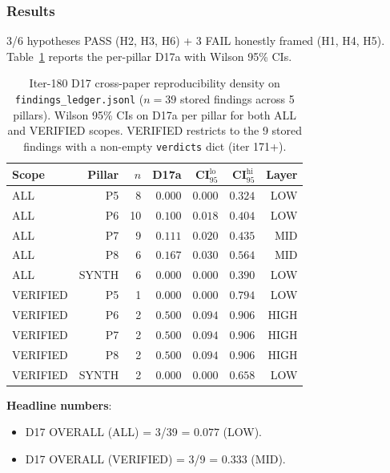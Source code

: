 \documentclass{article}
\begin{document}
\subsubsection{Results}\label{sec:synth-iter180-results}

3/6 hypotheses PASS (H2, H3, H6) + 3 FAIL honestly framed
(H1, H4, H5). Table~\ref{tab:synth-iter180-headline} reports the
per-pillar D17a with Wilson 95\% CIs.

\begin{table}[h]
\centering\small
\caption{Iter-180 D17 cross-paper reproducibility density on
\texttt{findings\_ledger.jsonl} ($n{=}39$ stored findings
across 5 pillars). Wilson 95\% CIs on D17a per pillar for both
ALL and VERIFIED scopes. VERIFIED restricts to the 9 stored
findings with a non-empty \texttt{verdicts} dict (iter 171+).}
\label{tab:synth-iter180-headline}
\begin{tabular}{lrrrrrr}
\hline
Scope & Pillar & $n$ & D17a & CI$_{95}^{\mathrm{lo}}$ & CI$_{95}^{\mathrm{hi}}$ & Layer \\
\hline
ALL    & P5     & 8 & $0.000$ & $0.000$ & $0.324$ & LOW  \\
ALL    & P6     & 10 & $0.100$ & $0.018$ & $0.404$ & LOW  \\
ALL    & P7     & 9  & $0.111$ & $0.020$ & $0.435$ & MID  \\
ALL    & P8     & 6  & $0.167$ & $0.030$ & $0.564$ & MID  \\
ALL    & SYNTH  & 6  & $0.000$ & $0.000$ & $0.390$ & LOW  \\
VERIFIED & P5   & 1  & $0.000$ & $0.000$ & $0.794$ & LOW  \\
VERIFIED & P6   & 2  & $0.500$ & $0.094$ & $0.906$ & HIGH \\
VERIFIED & P7   & 2  & $0.500$ & $0.094$ & $0.906$ & HIGH \\
VERIFIED & P8   & 2  & $0.500$ & $0.094$ & $0.906$ & HIGH \\
VERIFIED & SYNTH & 2 & $0.000$ & $0.000$ & $0.658$ & LOW  \\
\hline
\end{tabular}
\end{table}

\textbf{Headline numbers}:
\begin{itemize}
\item D17 OVERALL (ALL) = 3/39 = $0.077$ (LOW).
\item D17 OVERALL (VERIFIED) = 3/9 = $0.333$ (MID).
\end{itemize}
\end{document}
